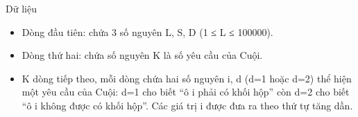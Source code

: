 Dữ liệu
\begin{itemize}
	\item Dòng đầu tiên: chứa 3 số nguyên L, S, D (1 ≤ L ≤ 100000).
	\item Dòng thứ hai: chứa số nguyên K là số yêu cầu của Cuội.
	\item K dòng tiếp theo, mỗi dòng chứa hai số nguyên i, d (d=1 hoặc d=2) thể hiện một yêu cầu của Cuội: d=1 cho biết “ô i phải có khối hộp” còn d=2 cho biết “ô i không được có khối hộp”. Các giá trị i được đưa ra theo thứ tự tăng dần.
\end{itemize}